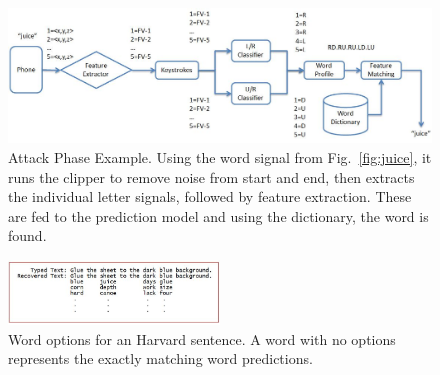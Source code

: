 \documentclass[11pt,conference]{IEEEtran}
\begin{document}
\begin{figure}
\centering
\includegraphics[width=.9\textwidth]{flowchart2}
\caption{Attack Phase Example. Using the word signal from Fig.~\ref{fig:juice}, it runs the clipper to remove noise from
start and end, then extracts the individual letter signals, followed by feature extraction. These are fed to the prediction
model and using the dictionary, the word is found.}
\label{fig:flowchart2}
\end{figure}

\begin{figure}
\centering
\includegraphics[width=0.5\textwidth]{img/words-options}
\caption{Word options for an Harvard sentence. A word with no options represents the
exactly matching word predictions.}
\label{fig:words-options}
\end{figure}

\begin{table}[h]
\centering
{%
{}
}
\caption{Test accuracies of different machine learning algorithms on the test dataset.}
\label{tab:algos-compare}
\end{table}
\end{document}
